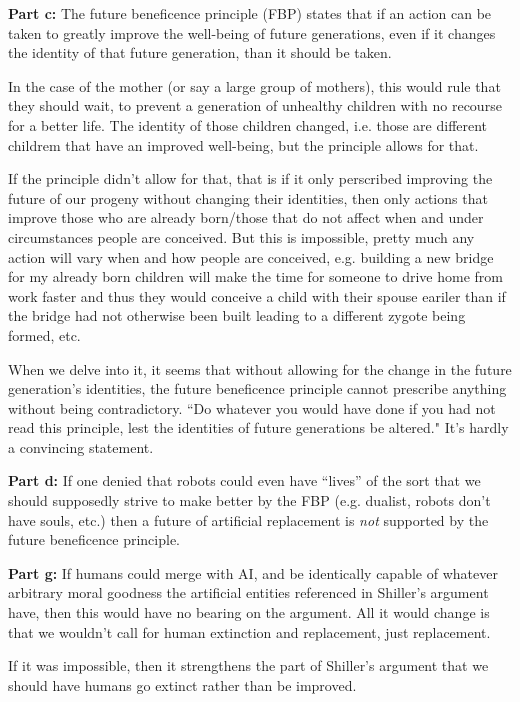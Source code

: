 \documentclass{article}
\begin{document}
\noindent\textbf{Part c:} The future beneficence principle (FBP) states that if an action can be taken to greatly improve the well-being of future generations, even if it changes the identity of that future generation, than it should be taken.

In the case of the mother (or say a large group of mothers), this would rule that they should wait, to prevent a generation of unhealthy children with no recourse for a better life. The identity of those children changed, i.e. those are different childrem that have an improved well-being, but the principle allows for that.

If the principle didn't allow for that, that is if it only perscribed improving the future of our progeny without changing their identities, then only actions that improve those who are already born/those that do not affect when and under circumstances people are conceived. But this is impossible, pretty much any action will vary when and how people are conceived, e.g. building a new bridge for my already born children will make the time for someone to drive home from work faster and thus they would conceive a child with their spouse eariler than if the bridge had not otherwise been built leading to a different zygote being formed, etc.

When we delve into it, it seems that without allowing for the change in the future generation's identities, the future beneficence principle cannot prescribe anything without being contradictory. ``Do whatever you would have done if you had not read this principle, lest the identities of future generations be altered." It's hardly a convincing statement.
\bigskip

\noindent\textbf{Part d:} If one denied that robots could even have ``lives'' of the sort that we should supposedly strive to make better by the FBP (e.g. dualist, robots don't have souls, etc.) then a future of artificial replacement is \textit{not} supported by the future beneficence principle.
\bigskip

\noindent\textbf{Part g:} If humans could merge with AI, and be identically capable of whatever arbitrary moral goodness the artificial entities referenced in Shiller's argument have, then this would have no bearing on the argument. All it would change is that we wouldn't call for human extinction and replacement, just replacement.

If it was impossible, then it strengthens the part of Shiller's argument that we should have humans go extinct rather than be improved.
\end{document}
